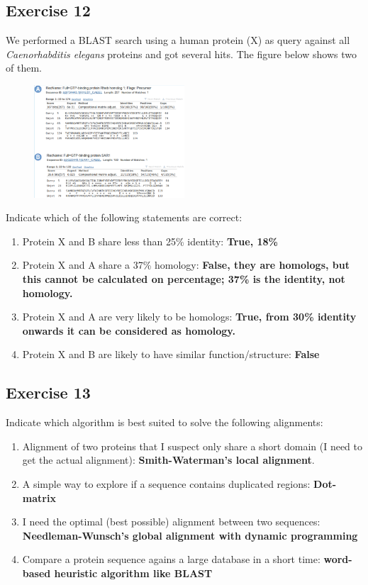 \subsection{Exercise 12}
We performed a BLAST search using a human protein (X) as query against all \textit{Caenorhabditis elegans} proteins and got several hits. The figure below shows two of them.

\begin{figure}[htbp]
\centering
\includegraphics[width = 0.5\textwidth]{figs/exam-ex12.png}
\end{figure}

Indicate which of the following statements are correct:
\begin{enumerate}
\item Protein X and B share less than 25\% identity: \textbf{True, 18\%}
\item Protein X and A share a 37\% homology: \textbf{False, they are homologs, but this cannot be calculated on percentage; 37\% is the identity, not homology.}
\item Protein X and A are very likely to be homologs: \textbf{True, from 30\% identity onwards it can be considered as homology.}
\item Protein X and B are likely to have similar function/structure: \textbf{False}
\end{enumerate}

\subsection{Exercise 13}
Indicate which algorithm is best suited to solve the following alignments:
\begin{enumerate}
\item Alignment of two proteins that I suspect only share a short domain (I need to get the actual alignment): \textbf{Smith-Waterman's local alignment}.
\item A simple way to explore if a sequence contains duplicated regions: \textbf{Dot-matrix}
\item I need the optimal (best possible) alignment between two sequences: \textbf{Needleman-Wunsch's global alignment with dynamic programming}
\item Compare a protein sequence agains a large database in a short time: \textbf{word-based heuristic algorithm like BLAST}
\end{enumerate}

